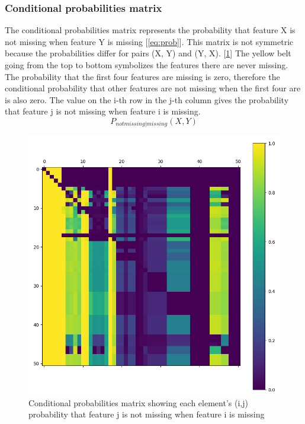 \documentclass[11pt]{article}
\begin{document}
      \subsubsection{Conditional probabilities matrix}
        The conditional probabilities matrix represents the probability that feature X is not missing when feature Y is missing [\ref{eq:prob}]. This matrix is not symmetric because the probabilities differ for pairs (X, Y) and (Y, X). [\ref{figure:cond_prob_matrix}] The yellow belt going from the top to bottom symbolizes the features there are never missing.  The probability that the first four features are missing is zero, therefore the conditional probability that other features are not missing when the first four are is also zero. The value on the i-th row in the j-th column gives the probability that feature j is not missing when feature i is missing.
        \begin{equation}
          \label{eq:prob}
          P_{not missing | missing}(X, Y)
        \end{equation}
        \begin{figure}
          \centering
          \includegraphics[scale=0.4]{thesis_res/cond/heatmap_cropped.png}
          \caption{Conditional probabilities matrix showing each element's (i,j) probability that feature j is not missing when feature i is missing}
          \label{figure:cond_prob_matrix}
        \end{figure}
        \newpage
\end{document}
